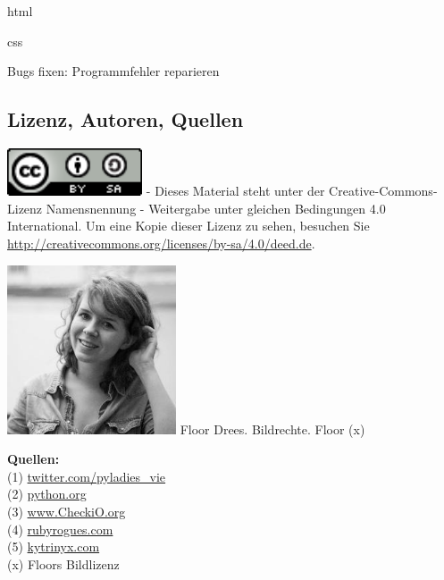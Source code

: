 html

css

Bugs fixen: Programmfehler reparieren

\subsection*{Lizenz, Autoren, Quellen}
\includegraphics[width=4cm]{ccbysa88x31.png} -
Dieses Material steht unter der Creative-Commons-Lizenz Namensnennung - Weitergabe unter gleichen Bedingungen 4.0 International. Um eine Kopie dieser Lizenz zu sehen, besuchen Sie \url{http://creativecommons.org/licenses/by-sa/4.0/deed.de}.

\begin{center}
\includegraphics[width=5cm]{floor.jpg}
\footnotesize{Floor Drees. Bildrechte. Floor (x)}
\end{center}



\textbf{Quellen:} \\
(1) \href{https://twitter.com/pyladies_vie}{twitter.com/pyladies\_vie} \\
(2) \href{http://python.org}{python.org} \\
(3) \href{http://www.checkio.org/}{www.CheckiO.org} \\
(4) \href{http://rubyrogues.com/}{rubyrogues.com} \\
(5) \href{http://kytrinyx.com/}{kytrinyx.com} \\
(x) Floors Bildlizenz \\

